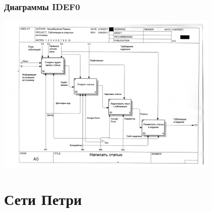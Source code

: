 \documentclass{../../slides-style}
\begin{document}
    \begin{frame}
        \frametitle{Диаграммы IDEF0}
        \begin{center}
            \includegraphics[width=0.80\textwidth]{idef0.png}
        \end{center}
    \end{frame}

    \section{Сети Петри}
\end{document}
